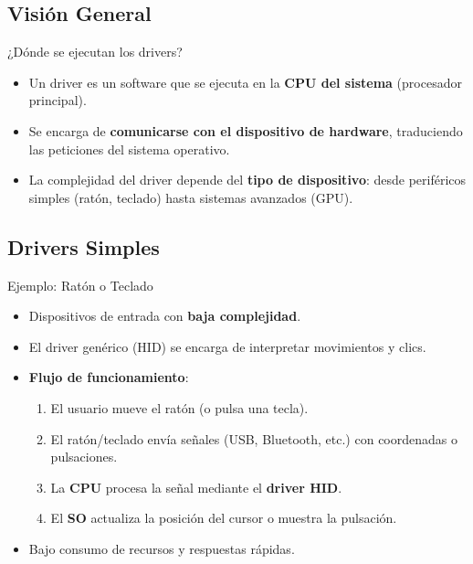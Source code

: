\documentclass{beamer}
\begin{document}
\subsection{Visión General}

\begin{frame}{¿Dónde se ejecutan los drivers?}
    \begin{itemize}
        \item Un driver es un software que se ejecuta en la \textbf{CPU del sistema} (procesador principal).
        \item Se encarga de \textbf{comunicarse con el dispositivo de hardware}, traduciendo las peticiones del sistema operativo.
        \item La complejidad del driver depende del \textbf{tipo de dispositivo}: desde periféricos simples (ratón, teclado) hasta sistemas avanzados (GPU).
    \end{itemize}
\end{frame}

\subsection{Drivers Simples}

\begin{frame}{Ejemplo: Ratón o Teclado}
    \begin{itemize}
        \item Dispositivos de entrada con \textbf{baja complejidad}.
        \item El driver genérico (HID) se encarga de interpretar movimientos y clics.
        \item \textbf{Flujo de funcionamiento}:
            \begin{enumerate}
                \item El usuario mueve el ratón (o pulsa una tecla).
                \item El ratón/teclado envía señales (USB, Bluetooth, etc.) con coordenadas o pulsaciones.
                \item La \textbf{CPU} procesa la señal mediante el \textbf{driver HID}.
                \item El \textbf{SO} actualiza la posición del cursor o muestra la pulsación.
            \end{enumerate}
        \item Bajo consumo de recursos y respuestas rápidas.
    \end{itemize}
\end{frame}
\end{document}
